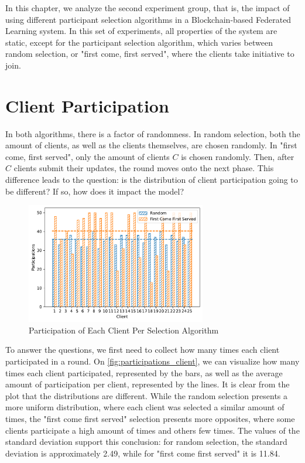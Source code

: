 In this chapter, we analyze the second experiment group, that is, the impact of using different participant selection algorithms in a Blockchain-based Federated Learning system. In this set of experiments, all properties of the system are static, except for the participant selection algorithm, which varies between random selection, or "first come, first served", where the clients take initiative to join.

\section{Client Participation}

In both algorithms, there is a factor of randomness. In random selection, both the amount of clients, as well as the clients themselves, are chosen randomly. In "first come, first served", only the amount of clients $C$ is chosen randomly. Then, after $C$ clients submit their updates, the round moves onto the next phase. This difference leads to the question: is the distribution of client participation going to be different? If so, how does it impact the model?

\begin{figure}[!ht]
    \centering
    \centering
    \includegraphics[width=0.7\textwidth]{graphics/selection/clients.pdf}
    \caption{Participation of Each Client Per Selection Algorithm}
    \label{fig:participations_client}
\end{figure}

To answer the questions, we first need to collect how many times each client participated in a round. On \autoref{fig:participations_client}, we can visualize how many times each client participated, represented by the bars, as well as the average amount of participation per client, represented by the lines. It is clear from the plot that the distributions are different. While the random selection presents a more uniform distribution, where each client was selected a similar amount of times, the "first come first served" selection presents more opposites, where some clients participate a high amount of times and others few times. The values of the standard deviation support this conclusion: for random selection, the standard deviation is approximately 2.49, while for "first come first served" it is 11.84.

